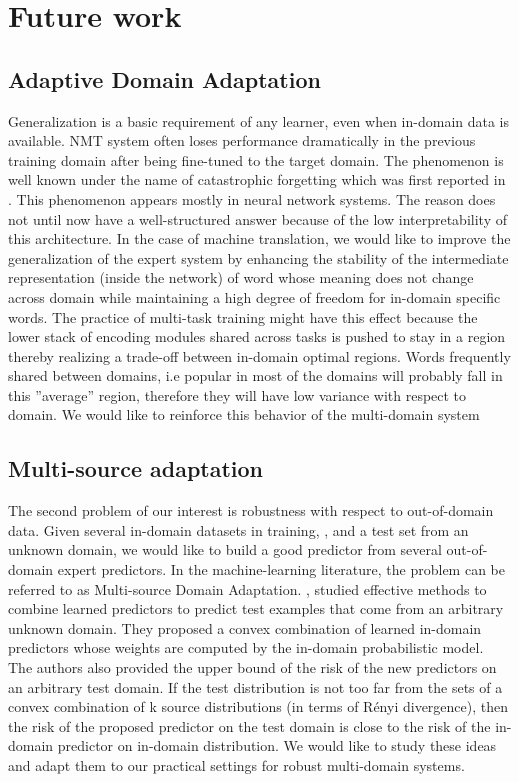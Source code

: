 \documentclass[12pt,a4paper,twoside]{report}
\theoremstyle{definition}
\begin{document}
\section*{Future work}
\subsection*{Adaptive Domain Adaptation}
Generalization is a basic requirement of any learner, even when in-domain data is available. NMT system often loses performance dramatically in the previous training domain after being fine-tuned to the target domain. The phenomenon is well known under the name of catastrophic forgetting which was first reported in \cite{Michael89catastrophic}. This phenomenon appears mostly in neural network systems. The reason does not until now have a well-structured answer because of the low interpretability of this architecture. In the case of machine translation, we would like to improve the generalization of the expert
system by enhancing the stability of the intermediate representation (inside the network) of word whose meaning does not change across domain while maintaining a high degree of freedom for in-domain specific words. The practice of multi-task training might have
this effect because the lower stack of encoding modules shared across tasks is pushed to stay in a region thereby realizing a trade-off between in-domain optimal regions. Words frequently shared between domains, i.e popular in most of the domains will probably fall in
this ”average” region, therefore they will have low variance with respect to domain. We would like to reinforce this behavior of the multi-domain system 

\subsection*{Multi-source adaptation}
The second problem of our interest is robustness with respect to out-of-domain data. Given several in-domain datasets in training, \cite{hoffman18algorithms}, and a test set from an unknown domain, we would like to build a good predictor from several out-of-domain expert predictors. In the machine-learning literature, the problem can be referred to as Multi-source Domain Adaptation. \cite{yishay09multiple}, \cite{mansour09domain} studied effective methods to combine learned predictors to predict test examples that come from an arbitrary unknown domain. They proposed a convex combination of learned in-domain predictors whose weights are computed by the in-domain probabilistic model. The authors also provided the upper bound of the risk of the new predictors on an arbitrary test domain. If the test distribution is not too far from the sets of a convex combination of k source distributions (in terms of Rényi divergence), then the risk of the proposed predictor on the test domain is close to the risk of the in-domain predictor on in-domain distribution. We would like to study these ideas and adapt them to our practical settings for robust multi-domain systems.
\end{document}
